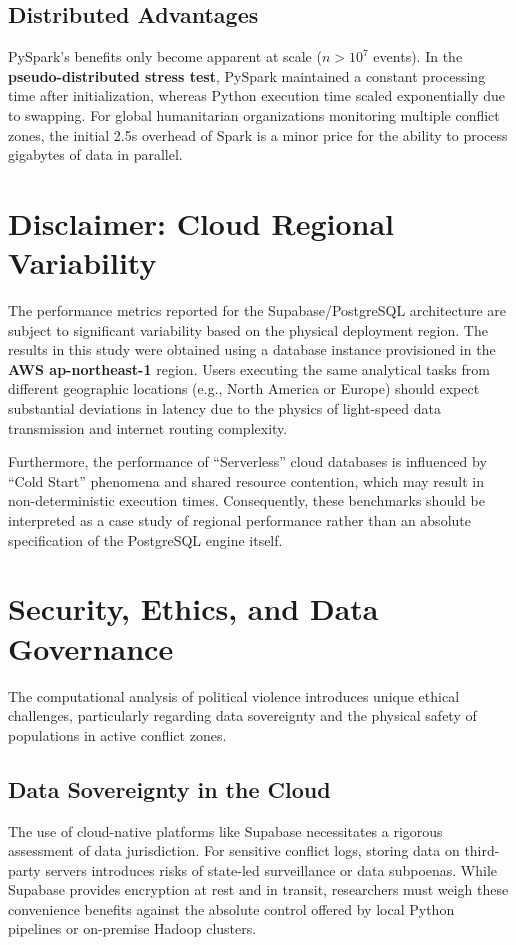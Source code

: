 \documentclass[conference]{IEEEtran}
\begin{document}
\subsection{Distributed Advantages}
PySpark's benefits only become apparent at scale ($n > 10^7$ events). In the \textbf{pseudo-distributed stress test}, PySpark maintained a constant processing time after initialization, whereas Python execution time scaled exponentially due to swapping. For global humanitarian organizations monitoring multiple conflict zones, the initial 2.5s overhead of Spark is a minor price for the ability to process gigabytes of data in parallel.

\section{Disclaimer: Cloud Regional Variability}

The performance metrics reported for the Supabase/PostgreSQL architecture are subject to significant variability based on the physical deployment region. The results in this study were obtained using a database instance provisioned in the \textbf{AWS ap-northeast-1} region. Users executing the same analytical tasks from different geographic locations (e.g., North America or Europe) should expect substantial deviations in latency due to the physics of light-speed data transmission and internet routing complexity. 

Furthermore, the performance of ``Serverless'' cloud databases is influenced by ``Cold Start'' phenomena and shared resource contention, which may result in non-deterministic execution times. Consequently, these benchmarks should be interpreted as a case study of regional performance rather than an absolute specification of the PostgreSQL engine itself.

\section{Security, Ethics, and Data Governance}

The computational analysis of political violence introduces unique ethical challenges, particularly regarding data sovereignty and the physical safety of populations in active conflict zones.

\subsection{Data Sovereignty in the Cloud}
The use of cloud-native platforms like Supabase necessitates a rigorous assessment of data jurisdiction. For sensitive conflict logs, storing data on third-party servers introduces risks of state-led surveillance or data subpoenas. While Supabase provides encryption at rest and in transit, researchers must weigh these convenience benefits against the absolute control offered by local Python pipelines or on-premise Hadoop clusters.
\end{document}
